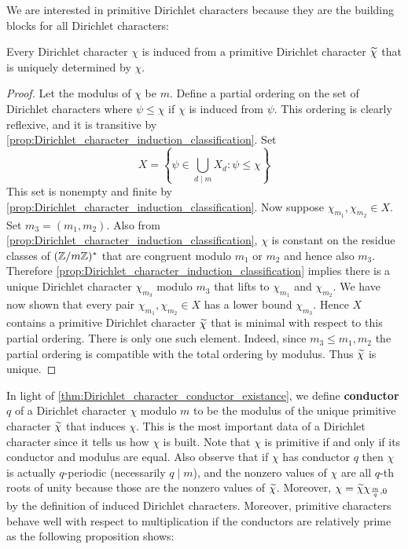     We are interested in primitive Dirichlet characters because they are the building blocks for all Dirichlet characters:

    \begin{theorem}\label{thm:Dirichlet_character_conductor_existance}
      Every Dirichlet character $\chi$ is induced from a primitive Dirichlet character $\widetilde{\chi}$ that is uniquely determined by $\chi$.
    \end{theorem}
    \begin{proof}
      Let the modulus of $\chi$ be $m$. Define a partial ordering on the set of Dirichlet characters where $\psi \le \chi$ if $\chi$ is induced from $\psi$. This ordering is clearly reflexive, and it is transitive by \cref{prop:Dirichlet_character_induction_classification}. Set
      \[
        X = \left\{\psi \in \bigcup_{d \mid m}X_{d}:\psi \le \chi\right\}
      \]
      This set is nonempty and finite by \cref{prop:Dirichlet_character_induction_classification}. Now suppose $\chi_{m_{1}},\chi_{m_{2}} \in X$. Set $m_{3} = (m_{1},m_{2})$. Also from \cref{prop:Dirichlet_character_induction_classification}, $\chi$ is constant on the residue classes of $(\mathbb{Z}/m\mathbb{Z})^{\ast}$ that are congruent modulo $m_{1}$ or $m_{2}$ and hence also $m_{3}$. Therefore \cref{prop:Dirichlet_character_induction_classification} implies there is a unique Dirichlet character $\chi_{m_{3}}$ modulo $m_{3}$ that lifts to $\chi_{m_{1}}$ and $\chi_{m_{2}}$. We have now shown that every pair $\chi_{m_{1}},\chi_{m_{2}} \in X$ has a lower bound $\chi_{m_{3}}$. Hence $X$ contains a primitive Dirichlet character $\widetilde{\chi}$ that is minimal with respect to this partial ordering. There is only one such element. Indeed, since $m_{3} \le m_{1},m_{2}$ the partial ordering is compatible with the total ordering by modulus. Thus $\widetilde{\chi}$ is unique.
    \end{proof}

    In light of \cref{thm:Dirichlet_character_conductor_existance}, we define \textbf{conductor} $q$ of a Dirichlet character $\chi$ modulo $m$ to be the modulus of the unique primitive character $\widetilde{\chi}$ that induces $\chi$. This is the most important data of a Dirichlet character since it tells us how $\chi$ is built. Note that $\chi$ is primitive if and only if its conductor and modulus are equal. Also observe that if $\chi$ has conductor $q$ then $\chi$ is actually $q$-periodic (necessarily $q \mid m$), and the nonzero values of $\chi$ are all $q$-th roots of unity because those are the nonzero values of $\widetilde{\chi}$. Moreover, $\chi = \widetilde{\chi}\chi_{\frac{m}{q},0}$ by the definition of induced Dirichlet characters. Moreover, primitive characters behave well with respect to multiplication if the conductors are relatively prime as the following proposition shows:

